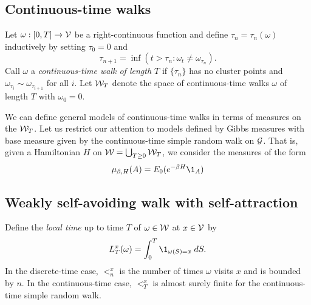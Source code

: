 \subsection{Continuous-time walks}

Let $\omega : [0, T] \rightarrow \mathcal{V}$ be a right-continuous function and define
$\tau_n = \tau_n(\omega)$ inductively by setting $\tau_0 = 0$ and
\begin{equation}
\tau_{n+1} = \inf (t > \tau_n : \omega_t \ne \omega_{\tau_n}).
\end{equation}
Call $\omega$ a \emph{continuous-time walk of length $T$} if $\{ \tau_n \}$
has no cluster points and $\omega_{\tau_i} \sim \omega_{\tau_{i+1}}$ for all $i$.
Let $\mathcal{W}_T$ denote the space of continuous-time walks $\omega$ of length $T$
with $\omega_0 = 0$.

We can define general models of continuous-time walks in terms of measures on
the $\mathcal{W}_T$. Let us restrict our attention to models defined by Gibbs measures
with base measure given by the continuous-time simple random walk on $\mathcal{G}$.
That is, given a Hamiltonian $H$ on $\mathcal{W} = \bigcup_{T \ge 0} \mathcal{W}_T$,
we consider the measures of the form
\begin{equation}
\mu_{\beta,H}(A) = E_0 (e^{-\beta H} \1_A)
\end{equation}


\subsection{Weakly self-avoiding walk with self-attraction}


Define the \emph{local time} up to time $T$ of $\omega \in \mathcal{W}$ at
$x \in \mathcal{V}$ by
\begin{equation}
\label{e:LTx-def}
\lt^x_T(\omega) = \int_0^T \1_{\omega(S)=x} \; dS.
\end{equation}
In the discrete-time case, $\lt^x_n$ is the number of times $\omega$ visits $x$
and is bounded by $n$. In the continuous-time case, $\lt^x_T$ is almost surely
finite for the continuous-time simple random walk.

